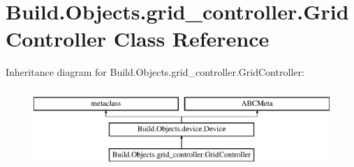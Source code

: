 \hypertarget{class_build_1_1_objects_1_1grid__controller_1_1_grid_controller}{}\section{Build.\+Objects.\+grid\+\_\+controller.\+Grid\+Controller Class Reference}
\label{class_build_1_1_objects_1_1grid__controller_1_1_grid_controller}
Inheritance diagram for Build.\+Objects.\+grid\+\_\+controller.\+Grid\+Controller\+:\begin{figure}[H]
\begin{center}
\leavevmode
\includegraphics[height=3.000000cm]{class_build_1_1_objects_1_1grid__controller_1_1_grid_controller}
\end{center}
\end{figure}

